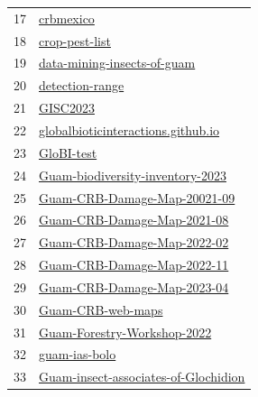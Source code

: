\begin{longtable}{rl}
	17 &                                                       \href{https://github.com/aubreymoore/crbmexico}{crbmexico} \\
	18 &                                             \href{https://github.com/aubreymoore/crop-pest-list}{crop-pest-list} \\
	19 &                   \href{https://github.com/aubreymoore/data-mining-insects-of-guam}{data-mining-insects-of-guam} \\
	20 &                                           \href{https://github.com/aubreymoore/detection-range}{detection-range} \\
	21 &                                                         \href{https://github.com/aubreymoore/GISC2023}{GISC2023} \\
	22 &     \href{https://github.com/aubreymoore/globalbioticinteractions.github.io}{globalbioticinteractions.github.io} \\
	23 &                                                     \href{https://github.com/aubreymoore/GloBI-test}{GloBI-test} \\
	24 &         \href{https://github.com/aubreymoore/Guam-biodiversity-inventory-2023}{Guam-biodiversity-inventory-2023} \\
	25 &                 \href{https://github.com/aubreymoore/Guam-CRB-Damage-Map-20021-09}{Guam-CRB-Damage-Map-20021-09} \\
	26 &                   \href{https://github.com/aubreymoore/Guam-CRB-Damage-Map-2021-08}{Guam-CRB-Damage-Map-2021-08} \\
	27 &                   \href{https://github.com/aubreymoore/Guam-CRB-Damage-Map-2022-02}{Guam-CRB-Damage-Map-2022-02} \\
	28 &                   \href{https://github.com/aubreymoore/Guam-CRB-Damage-Map-2022-11}{Guam-CRB-Damage-Map-2022-11} \\
	29 &                   \href{https://github.com/aubreymoore/Guam-CRB-Damage-Map-2023-04}{Guam-CRB-Damage-Map-2023-04} \\
	30 &                                       \href{https://github.com/aubreymoore/Guam-CRB-web-maps}{Guam-CRB-web-maps} \\
	31 &                   \href{https://github.com/aubreymoore/Guam-Forestry-Workshop-2022}{Guam-Forestry-Workshop-2022} \\
	32 &                                               \href{https://github.com/aubreymoore/guam-ias-bolo}{guam-ias-bolo} \\
	33 & \href{https://github.com/aubreymoore/Guam-insect-associates-of-Glochidion}{Guam-insect-associates-of-Glochidion} \\

\end{longtable}
